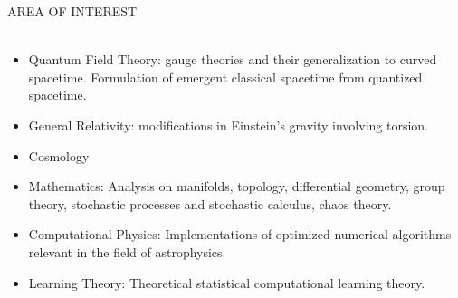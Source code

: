 \documentclass[a4paper]{article}
\newcommand{\lineunder} {
    \vspace*{-8pt} \\
    \hspace*{-18pt} \hrulefill \\
}
\newcommand{\header} [1] {
    {\hspace*{-18pt}\vspace*{6pt} \textsc{#1}}
    \vspace*{-6pt} \lineunder
}
\begin{document}
\header{AREA OF INTEREST}
\begin{itemize}
    \item Quantum Field Theory: gauge theories and their generalization to curved spacetime. Formulation of emergent classical spacetime from quantized spacetime.
    \item General Relativity: modifications in Einstein's gravity involving torsion.
    \item Cosmology
    \item Mathematics: Analysis on manifolds, topology, differential geometry, group theory, stochastic processes and stochastic calculus, chaos theory.
    \item Computational Physics: Implementations of optimized numerical algorithms relevant in the field of astrophysics. 
    \item Learning Theory: Theoretical statistical computational learning theory.
    
\end{itemize}
\end{document}
